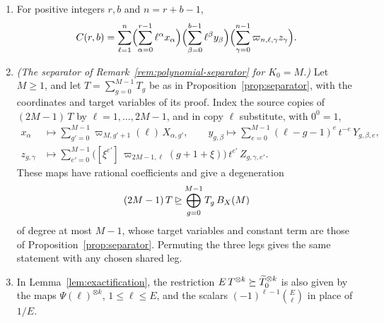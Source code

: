 \begin{lemma}\label{lem:rational-interpolation}
\leavevmode
\begin{enumerate}
\item[(a)] For positive integers \(r,b\) and \(n=r+b-1\),
\begin{equation}\label{eq:rational-convolution-rank}
 C(r,b)=\sum_{\ell=1}^{n}
 \Bigl(\sum_{\alpha=0}^{r-1}\ell^\alpha x_\alpha\Bigr)
 \Bigl(\sum_{\beta=0}^{b-1}\ell^\beta y_\beta\Bigr)
 \Bigl(\sum_{\gamma=0}^{n-1}\varpi_{n,\ell,\gamma}z_\gamma\Bigr).
\end{equation}
\item[(b)] \emph{(The separator of Remark~\ref{rem:polynomial-separator}
for \(K_0=M\).)} Let \(M\ge1\), and let \(T=\sum_{g=0}^{M-1}T_g\) be as in
Proposition~\ref{prop:separator}, with the coordinates and target
variables of its proof. Index the source copies of \((2M-1)\,T\) by
\(\ell=1,\ldots,2M-1\), and in copy \(\ell\) substitute, with
\(0^0=1\),
\begin{align*}
 x_\alpha&\longmapsto\sum_{g'=0}^{M-1}\varpi_{M,g'+1}(\ell)\,X_{\alpha,g'},
 \qquad
 y_{g,\beta}\longmapsto\sum_{e=0}^{M-1}(\ell-g-1)^e\,t^{-e}\,Y_{g,\beta,e},\\
 z_{g,\gamma}&\longmapsto\sum_{e'=0}^{M-1}
 \bigl([\xi^{e'}]\,\varpi_{2M-1,\ell}(g+1+\xi)\bigr)\,t^{e'}\,Z_{g,\gamma,e'}.
\end{align*}
These maps have rational coefficients and give a degeneration
\[
 (2M-1)\,T\unrhd\bigoplus_{g=0}^{M-1}T_g\,B_X(M)
\]
of degree at most \(M-1\), whose target variables and constant term are
those of Proposition~\ref{prop:separator}. Permuting the three legs gives
the same statement with any chosen shared leg.
\item[(c)] In Lemma~\ref{lem:exactification}, the restriction
\(E\,T^{\otimes k}\succeq\widetilde T_0^{\otimes k}\) is also given by
the maps \(\Psi(\ell)^{\otimes k}\), \(1\le\ell\le E\), and the scalars
\((-1)^{\ell-1}\binom E\ell\) in place of \(1/E\).
\end{enumerate}
\end{lemma}


